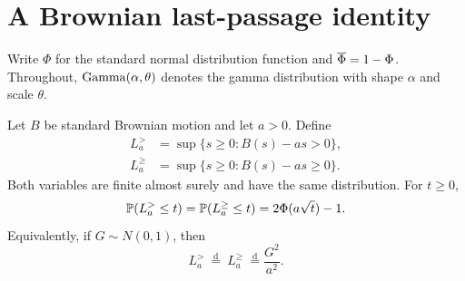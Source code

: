 \section{A Brownian last-passage identity}

Write $\Phi$ for the standard normal distribution function and
$\PhiBar=1-\Phi$.  Throughout, $\GammaLaw(\alpha,\theta)$ denotes the
gamma distribution with shape $\alpha$ and scale $\theta$.

\begin{lemma}\label{lem:last-passage}
Let $B$ be standard Brownian motion and let $a>0$.  Define
\begin{align}
  L_a^{>} &= \sup\{s\ge0:B(s)-as>0\},\label{eq:L-strict}\\
  L_a^{\ge} &= \sup\{s\ge0:B(s)-as\ge0\}.
  \label{eq:L-nonstrict}
\end{align}
Both variables are finite almost surely and have the same distribution.  For
$t\ge0$,
\begin{equation}\label{eq:last-passage-cdf}
  \P(L_a^{>}\le t)
  =\P(L_a^{\ge}\le t)
  =2\Phi(a\sqrt t)-1.
\end{equation}
Equivalently, if $G\sim N(0,1)$, then
\begin{equation}\label{eq:last-passage-chi-square}
  L_a^{>}\ \stackrel{\mathrm d}{=}\
  L_a^{\ge}\ \stackrel{\mathrm d}{=}\frac{G^2}{a^2}.
\end{equation}
\end{lemma}

